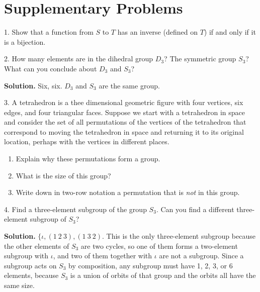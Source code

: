 \documentclass[10pt,]{book}
\theoremstyle{plain}
\theoremstyle{definition}
\theoremstyle{definition}
\numberwithin{equation}{chapter}
\begin{document}
\section[{Supplementary Problems}]{Supplementary Problems}\label{sec_groups-suppprobs}
\begin{exerciselist}
\item[1.]\hypertarget{exercise-54}{}Show that a function from \(S\) to \(T\) has an inverse (defined on \(T\)) if and only if it is a bijection.%
\par\smallskip
\item[2.]\hypertarget{exercise-55}{}How many elements are in the dihedral group \(D_3\)?  The symmetric group \(S_3\)?  What can you conclude about \(D_3\) and \(S_3\)?%
\par\smallskip
\par\smallskip
\noindent\textbf{Solution.}\hypertarget{solution-523}{}\quad
Six, six. \(D_3\) and \(S_3\) are the same group.%
\item[3.]\hypertarget{exercise-56}{}A tetrahedron is a thee dimensional geometric figure with four vertices, six edges, and four triangular faces.  Suppose we start with a tetrahedron in space and consider the set of all permutations of the vertices of the tetrahedron that correspond to moving the tetrahedron in space and returning it to its original location, perhaps with the vertices in different places. \leavevmode%
\begin{enumerate}[label=(\alph*)]
\item\hypertarget{li-118}{}Explain why these permutations form a group.%
\item\hypertarget{li-119}{}What is the size of this group?%
\item\hypertarget{li-120}{}Write down in two-row notation a permutation that is \emph{not} in this group.%
\end{enumerate}
%
\par\smallskip
\item[4.]\hypertarget{exercise-57}{}Find a three-element subgroup of the group \(S_3\).  Can you find a different three-element subgroup of \(S_3\)?%
\par\smallskip
\par\smallskip
\noindent\textbf{Solution.}\hypertarget{solution-524}{}\quad
\(\{\iota,(1\ 2\ 3),(1\ 3\ 2)\). This is the only three-element subgroup because the other elements of \(S_3\) are two cycles, so one of them forms a two-element subgroup with \(\iota\), and two of them together with \(\iota\) are not a subgroup. Since a subgroup acts on \(S_3\) by composition, any subgroup must have 1, 2, 3, or 6 elements, because \(S_3\) is a union of orbits of that group and the orbits all have the same size.%

\end{exerciselist}
\end{document}
